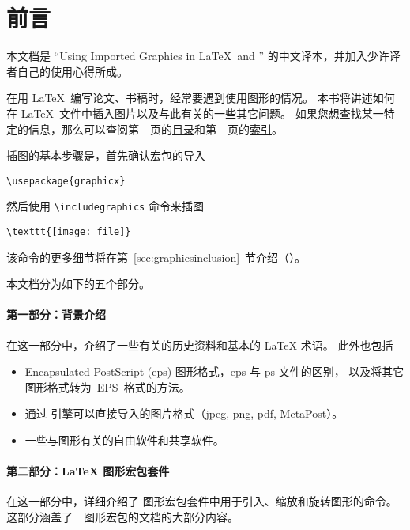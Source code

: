 \section*{前言}
\label{sect:preface}

本文档是 ``Using Imported Graphics in \LaTeX\ and \pdfLaTeX'' 的中文译本，并加入少许译者自己的使用心得所成。

在用 \LaTeX\ 编写论文、书稿时，经常要遇到使用图形的情况。
本书将讲述如何在 \LaTeX\ 文件中插入图片以及与此有关的一些其它问题。
如果您想查找某一特定的信息，那么可以查阅第~\pageref{toc}~页的\hyperref[toc]{目录}和第~\pageref{sec:index}~页的\hyperref[sec:index]{索引}。

插图的基本步骤是，首先确认宏包的导入
\begin{Verbatim}
\usepackage{graphicx}
\end{Verbatim}
然后使用 \verb|\includegraphics| 命令来插图
\begin{Verbatim}
\texttt{[image: file]}
\end{Verbatim}
该命令的更多细节将在第~\ref{sec:graphicsinclusion}~节介绍（\pageref{sec:graphicsinclusion}）。

本文档分为如下的五个部分。

\paragraph{第一部分：背景介绍}
在这一部分中，介绍了一些有关的历史资料和基本的 \LaTeX{} 术语。
此外也包括
\begin{itemize}
	\item Encapsulated PostScript (eps) 图形格式，eps 与 ps 文件的区别，
	以及将其它图形格式转为~EPS~格式的方法。
	\item 通过 \pdfTeX 引擎可以直接导入的图片格式（jpeg, png, pdf, MetaPost）。
	\item 一些与图形有关的自由软件和共享软件。
\end{itemize}

\paragraph{第二部分：\LaTeX{} 图形宏包套件}
在这一部分中，详细介绍了 \LaTeXe{} 图形宏包套件中用于引入、缩放和旋转图形的命令。
这部分涵盖了~\LaTeXe{}~图形宏包的文档的大部分内容\cite{grfguide}。

